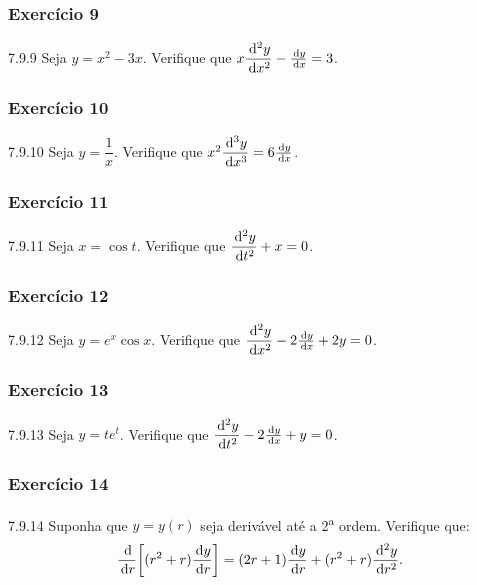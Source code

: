 \subsubsection*{Exercício 9}
\begin{exercicio}[9]{7.9.9}
Seja $y = x^2 - 3x$. Verifique que $x \dfrac{\,\mathrm{d}^2 y}{\,\mathrm{d} x^2} - \frac{\,\mathrm{d} y}{\,\mathrm{d} x} = 3$.
\end{exercicio}

\subsubsection*{Exercício 10}
\begin{exercicio}[10]{7.9.10}
Seja $y = \dfrac{1}{x}$. Verifique que $x^2 \dfrac{\,\mathrm{d}^3 y}{\,\mathrm{d} x^3} = 6 \frac{\,\mathrm{d} y}{\,\mathrm{d} x}$.
\end{exercicio}

\subsubsection*{Exercício 11}
\begin{exercicio}[11]{7.9.11}
Seja $x = \cos t$. Verifique que $\dfrac{\,\mathrm{d}^2 y}{\,\mathrm{d} t^2} + x = 0$.
\end{exercicio}

\subsubsection*{Exercício 12}
\begin{exercicio}[12]{7.9.12}
Seja $y = e^x \cos x$. Verifique que $\dfrac{\,\mathrm{d}^2 y}{\,\mathrm{d} x^2} - 2\frac{\,\mathrm{d} y}{\,\mathrm{d} x} + 2y = 0$.
\end{exercicio}

\subsubsection*{Exercício 13}
\begin{exercicio}[13]{7.9.13}
Seja $y = te^t$. Verifique que $\dfrac{\,\mathrm{d}^2 y}{\,\mathrm{d} t^2} - 2\frac{\,\mathrm{d} y}{\,\mathrm{d} x} + y = 0$.
\end{exercicio}

\subsubsection*{Exercício 14}
\begin{exercicio}[14]{7.9.14}
Suponha que $y = y(r)$ seja derivável até a 2\textsuperscript{a} ordem. Verifique que:
\[
\frac{\,\mathrm{d}}{\,\mathrm{d} r}\!\left[(r^2 + r)\frac{\,\mathrm{d} y}{\,\mathrm{d} r}\right] = (2r + 1)\frac{\,\mathrm{d} y}{\,\mathrm{d} r} + (r^2 + r)\frac{\,\mathrm{d}^2 y}{\,\mathrm{d} r^2}.
\]
\end{exercicio}

